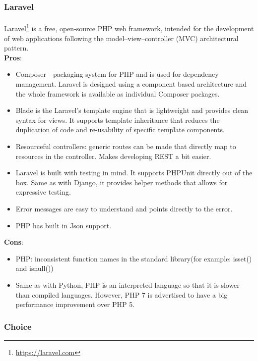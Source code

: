 \documentclass{l4proj}
\begin{document}
\subsubsection{Laravel}
\paragraph{}
Laravel\footnote{\url{https://laravel.com}} is a free, open-source PHP web framework, intended for the development of web applications following the model–view–controller (MVC) architectural pattern.
\\ \textbf{Pros}:
\begin{itemize}
	\item Composer - packaging system for PHP and is used for dependency management. Laravel is designed using a component based architecture and the whole framework is available as individual Composer packages. 
	\item Blade is the Laravel's template engine that is lightweight and provides clean syntax for views. It supports template inheritance that reduces the duplication of code and re-usability of specific template components. 
	\item Resourceful controllers: generic routes can be made that directly map to resources in the controller. Makes developing REST a bit easier.
	\item Laravel is built with testing in mind. It supports PHPUnit directly out of the box. Same as with Django, it provides helper methods that allows for expressive testing.  
	\item Error messages are easy to understand and points directly to the error.
	\item PHP has built in Json support.
\end{itemize}
\textbf{Cons}:
\begin{itemize}
	\item PHP: inconsistent function names in the standard library(for example: isset() and isnull())
	\item Same as with Python, PHP is an interpreted language so that it is slower than compiled languages. However, PHP 7 is advertised to have a big performance improvement over PHP 5.
\end{itemize}

\subsubsection{Choice}
\end{document}
